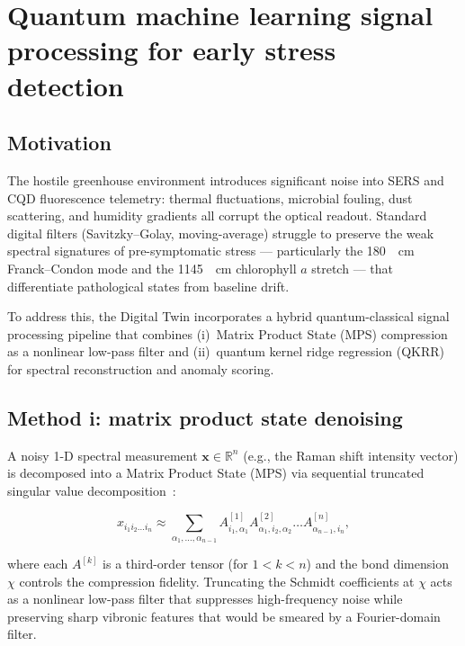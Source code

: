 \documentclass[11pt,a4paper]{article}
\begin{document}

\section{Quantum machine learning signal processing for early stress detection}
\label{SI-sec:qml}

\subsection{Motivation}

The hostile greenhouse environment introduces significant noise into SERS and CQD fluorescence telemetry: thermal fluctuations, microbial fouling, dust scattering, and humidity gradients all corrupt the optical readout. Standard digital filters (Savitzky--Golay, moving-average) struggle to preserve the weak spectral signatures of pre-symptomatic stress --- particularly the \qty{180}{\per\cm} Franck--Condon mode and the \qty{1145}{\per\cm} chlorophyll $a$  stretch --- that differentiate pathological states from baseline drift.

To address this, the Digital Twin incorporates a hybrid quantum-classical signal processing pipeline that combines (i)~Matrix Product State (MPS) compression as a nonlinear low-pass filter and (ii)~quantum kernel ridge regression (QKRR) for spectral reconstruction and anomaly scoring.

\subsection{Method i: matrix product state denoising}

A noisy 1-D spectral measurement $\mathbf{x} \in \mathbb{R}^n$ (e.g., the Raman shift intensity vector) is decomposed into a Matrix Product State (MPS) via sequential truncated singular value decomposition~\cite{Stoudenmire2016}:

\begin{equation}
x_{i_1 i_2 \dots i_n} \approx \sum_{\alpha_1,\dots,\alpha_{n-1}} A^{[1]}_{i_1,\alpha_1} A^{[2]}_{\alpha_1,i_2,\alpha_2} \dots A^{[n]}_{\alpha_{n-1},i_n},
\label{eq:SI_mps_decomp}
\end{equation}

where each $A^{[k]}$ is a third-order tensor (for $1<k<n$) and the bond dimension $\chi$ controls the compression fidelity. Truncating the Schmidt coefficients at $\chi$ acts as a nonlinear low-pass filter that suppresses high-frequency noise while preserving sharp vibronic features that would be smeared by a Fourier-domain filter.
\end{document}
